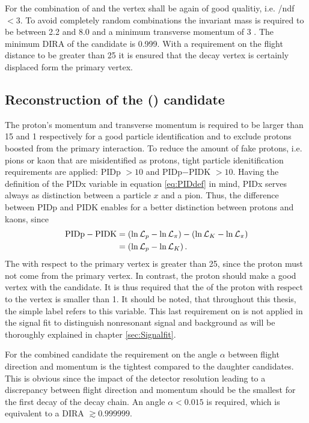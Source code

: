 For the combination of \Dz and \mun the vertex shall be again of good qualitiy, i.e. \chisqvtx/ndf $<3$.
To avoid completely random combinations the invariant \Dz\mun mass is required to be between 2.2 and 8.0 \gev and a minimum transverse momentum of 3 \gev.
The minimum DIRA of the \Dz\mun candidate is 0.999.
With a requirement on the flight distance \chisq to be greater than 25 it is ensured that the \Dz\mun decay vertex is certainly displaced form the primary vertex.

\subsection{Reconstruction of the \Lb (\Dz\mun\proton) candidate}
\label{sec:Selection_D0pmu}
The proton's momentum and transverse momentum is required to be larger than 15 \gev and 1 \gev respectively for a good particle identification and to exclude protons boosted from the primary interaction.
To reduce the amount of fake protons, i.e. pions or kaon that are misidentified as protons, tight particle idenitification requirements are applied: PIDp $> 10$ and PIDp$-$PIDK $> 10$.
Having the definition of the PIDx variable in equation \ref{eq:PIDdef} in mind, PIDx serves always as distinction between a particle $x$ and a pion.
Thus, the difference between PIDp and PIDK enables for a better distinction between protons and kaons, since
\begin{align*}
    \text{PIDp}-\text{PIDK} &= \left(\ln \mathcal{L}_{{p}} - \ln \mathcal{L}_{\pi}\right) - \left(\ln \mathcal{L}_{{K}} - \ln \mathcal{L}_{\pi}\right) \\
    & = \left(\ln \mathcal{L}_{{p}} - \ln \mathcal{L}_{{K}}\right).
\end{align*}
The \chisqip with respect to the primary vertex is greater than 25, since the proton must not come from the primary vertex.
In contrast, the proton should make a good vertex with the \Dz\mun candidate.
It is thus required that the \logIP of the proton with respect to the \Dz\mun vertex is smaller than 1.
It should be noted, that throughout this thesis, the simple label \logIP refers to this variable.
This last requirement on \logIP is not applied in the signal fit to distinguish nonresonant signal and background as will be thoroughly explained in chapter \ref{sec:Signalfit}.

For the combined \Dz\mun\proton candidate the requirement on the angle $\alpha$ between flight direction and momentum is the tightest compared to the daughter candidates.
This is obvious since the impact of the detector resolution leading to a discrepancy between flight direction and momentum should be the smallest for the first decay of the decay chain.
An angle $\alpha < 0.015$ is required, which is equivalent to a DIRA $\gtrsim 0.999999$.


